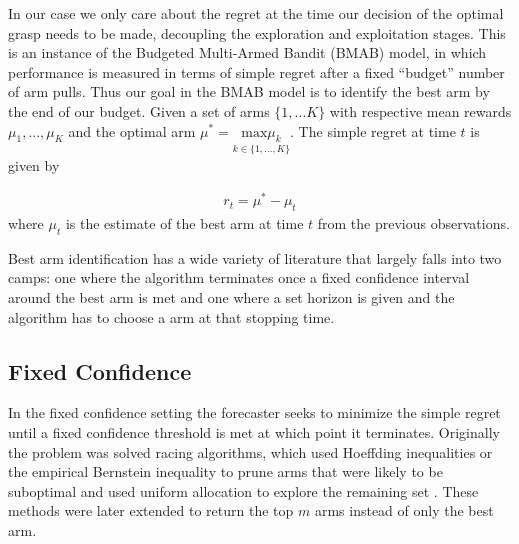 \documentclass[letterpaper, 10 pt, conference]{ieeeconf}  %
\begin{document}
In our case we only care about the regret at the time our decision of the optimal grasp needs to be made, decoupling the exploration and exploitation stages. 
This is an instance of the Budgeted Multi-Armed Bandit (BMAB) model, in which performance is measured in terms of simple regret after a fixed ``budget'' number of arm pulls. Thus our goal in the BMAB model is to identify the best arm by the end of our budget. Given a set of arms $\lbrace 1,...K \rbrace$ with respective mean rewards $\mu_1, ..., \mu_K$ and the optimal arm $\mu^* = \underset{k\in\lbrace 1, ..., K \rbrace}{\mbox{max}\mu_k}$. The simple regret at time $t$ is given by

\vspace{-2ex}
\begin{align}\label{eq:simple_regret}
r_t = \mu^* - \mu_t
\end{align}
\noindent where $\mu_t$ is the estimate of the best arm at time $t$ from the previous observations. 

Best arm identification has a wide variety of literature that largely falls into two camps: one where the algorithm terminates once a fixed confidence interval around the best arm is met and one where a set horizon is given and the algorithm has to choose a arm at that stopping time.

\subsection{Fixed Confidence}
In the fixed confidence setting the forecaster seeks to minimize the simple regret until a fixed confidence threshold is met at which point it terminates. Originally the problem was solved racing algorithms, which used Hoeffding inequalities or the empirical Bernstein inequality to prune arms that were likely to be suboptimal and used uniform allocation to explore the remaining set \cite{maron1993hoeffding} \cite{mnih2008empirical}. These methods were later extended to return the top $m$ arms instead of only the best arm\cite{gabillon2012best}.
\end{document}
